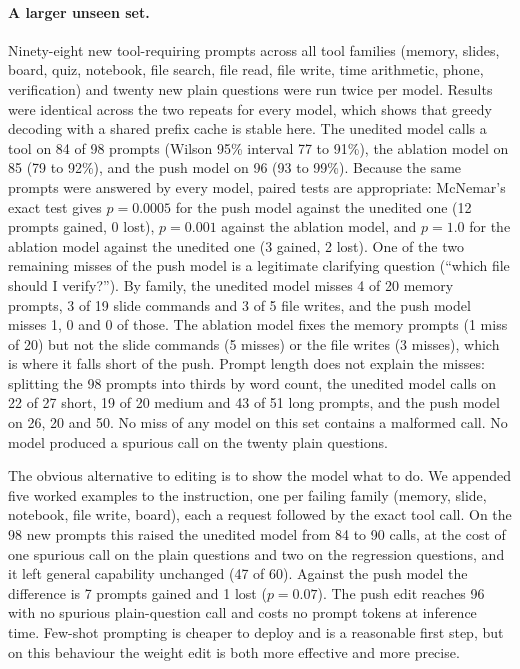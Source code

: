 \documentclass[11pt]{article}
\begin{document}
\paragraph{A larger unseen set.} Ninety-eight new tool-requiring prompts across all tool families (memory, slides, board, quiz, notebook, file search, file read, file write, time arithmetic, phone, verification) and twenty new plain questions were run twice per model. Results were identical across the two repeats for every model, which shows that greedy decoding with a shared prefix cache is stable here. The unedited model calls a tool on 84 of 98 prompts (Wilson 95\% interval 77 to 91\%), the ablation model on 85 (79 to 92\%), and the push model on 96 (93 to 99\%). Because the same prompts were answered by every model, paired tests are appropriate: McNemar's exact test gives $p = 0.0005$ for the push model against the unedited one (12 prompts gained, 0 lost), $p = 0.001$ against the ablation model, and $p = 1.0$ for the ablation model against the unedited one (3 gained, 2 lost). One of the two remaining misses of the push model is a legitimate clarifying question (``which file should I verify?''). By family, the unedited model misses 4 of 20 memory prompts, 3 of 19 slide commands and 3 of 5 file writes, and the push model misses 1, 0 and 0 of those. The ablation model fixes the memory prompts (1 miss of 20) but not the slide commands (5 misses) or the file writes (3 misses), which is where it falls short of the push. Prompt length does not explain the misses: splitting the 98 prompts into thirds by word count, the unedited model calls on 22 of 27 short, 19 of 20 medium and 43 of 51 long prompts, and the push model on 26, 20 and 50. No miss of any model on this set contains a malformed call. No model produced a spurious call on the twenty plain questions.

The obvious alternative to editing is to show the model what to do. We appended five worked examples to the instruction, one per failing family (memory, slide, notebook, file write, board), each a request followed by the exact tool call. On the 98 new prompts this raised the unedited model from 84 to 90 calls, at the cost of one spurious call on the plain questions and two on the regression questions, and it left general capability unchanged (47 of 60). Against the push model the difference is 7 prompts gained and 1 lost ($p = 0.07$). The push edit reaches 96 with no spurious plain-question call and costs no prompt tokens at inference time. Few-shot prompting is cheaper to deploy and is a reasonable first step, but on this behaviour the weight edit is both more effective and more precise.
\end{document}

